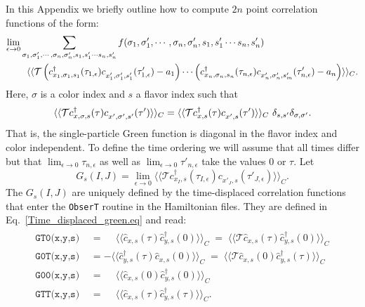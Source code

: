 In this Appendix we briefly  outline how to compute $2n$ point correlation functions   of the form: 
\begin{align}
\label{Time_dispalced_gen.eq}
	\lim_{\epsilon \rightarrow 0  } & \sum_{\sigma_1, \sigma'_1, \cdots, \sigma_n, \sigma'_n,  s_1, s'_1  \cdots s_n,  s'_n  }  f( \sigma_1, \sigma'_1, \cdots, \sigma_n, \sigma'_n,  s_1, s'_1  \cdots s_n,  s'_n ) 
	\nonumber    \\
         &  \, \, \, \,        \langle \langle {\cal T}  \left( c^{\dagger}_{x_1,\sigma_1,s_1}(\tau_{1,\epsilon}) c^{\phantom\dagger}_{x'_{1},\sigma'_1,s'_1}(\tau'_{1,\epsilon}) - a_1  \right)  \cdots 
	    \left( c^{\dagger}_{x_n,\sigma_n,s_n}(\tau_{n,\epsilon}) c^{\phantom\dagger}_{x'_{n},\sigma'_n,s'_m} (\tau'_{n,\epsilon}) - a_n  \right)   \rangle \rangle_C.
\end{align}
Here,  $ \sigma $ is a color  index and $s$ a flavor index such that 
\begin{equation}
	\langle \langle {\cal T}  c^{\dagger}_{x,\sigma,s}(\tau) c^{\phantom\dagger}_{x',\sigma',s'}(\tau')  \rangle \rangle_C  = 
	\langle \langle {\cal T}  c^{\dagger}_{x,s}(\tau) c^{\phantom\dagger}_{x',s}(\tau')  \rangle \rangle_C  \, \, \delta_{s,s'} \delta_{\sigma,\sigma'}.
\end{equation}
That is, the single-particle Green function is diagonal in the flavor index  and color  independent.   To  define the time ordering we will assume  that all times differ  but that $  \lim_{\epsilon \rightarrow 0 }    \tau_{n,\epsilon}  $   as well as $ \lim_{\epsilon \rightarrow 0 }    \tau'_{n,\epsilon} $  take the values $0$  or $\tau$.  
Let
\begin{equation}
	G_s(I,J)   =  \lim_{\epsilon \rightarrow 0 }\langle \langle   \mathcal{T}   c^{\dagger}_{x_I,s}(\tau_{I,\epsilon}) c^{\phantom\dagger}_{x'_{J},s}(\tau'_{J,\epsilon})  \rangle \rangle_{C} .
\end{equation}
The $G_s(I,J)  $  are  uniquely defined by the time-displaced correlation   functions  that enter  the \texttt{ObserT}   routine in the Hamiltonian files.  They are defined in Eq.~\eqref{Time_displaced_green.eq} and read: 
\begin{align}
\begin{aligned}
\texttt{GT0(x,y,s) }  &=   \phantom{+} \langle \langle \hat{c}^{\phantom\dagger}_{x,s} (\tau)   \hat{c}^{\dagger}_{y,s} (0)   \rangle \rangle_C \;=\; \langle \langle \mathcal{T} \hat{c}^{\phantom\dagger}_{x,s} (\tau)   \hat{c}^{\dagger}_{y,s} (0)   \rangle \rangle_C   \\
\texttt{G0T(x,y,s) }   &=  -   \langle \langle   \hat{c}^{\dagger}_{y,s} (\tau)    \hat{c}^{\phantom\dagger}_{x,s} (0)    \rangle \rangle_C \;=\;
    \langle \langle \mathcal{T} \hat{c}^{\phantom\dagger}_{x,s} (0)    \hat{c}^{\dagger}_{y,s} (\tau)   \rangle \rangle_C  \\
  \texttt{G00(x,y,s) }  &=    \phantom{+} \langle \langle \hat{c}^{\phantom\dagger}_{x,s} (0)   \hat{c}^{\dagger}_{y,s} (0)   \rangle \rangle_C    \\
    \texttt{GTT(x,y,s) }  &=   \phantom{+} \langle \langle \hat{c}^{\phantom\dagger}_{x,s} (\tau)   \hat{c}^{\dagger}_{y,s} (\tau)   \rangle \rangle_C.
\end{aligned}
\end{align}
